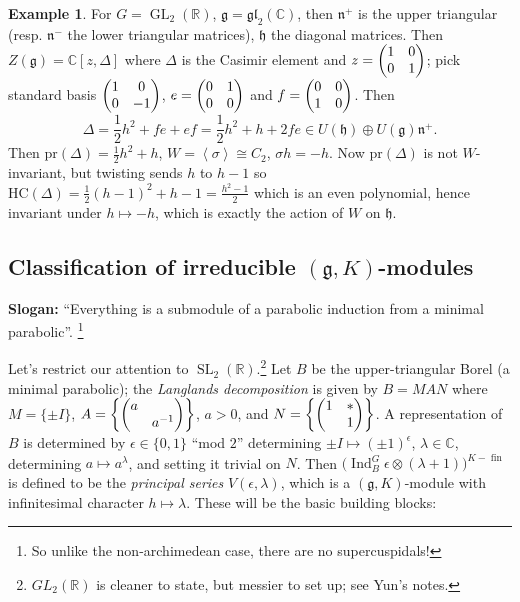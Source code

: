 \documentclass[11pt]{report}
\let\mf\mathfrak
\newcommand{\1}{\mathbbm 1}
\newcommand{\R}{\mathbb{R}}
\newcommand{\g}{\mf g}
\newcommand{\C}{\mathbb{C}}
\DeclareMathOperator{\fin}{fin}
\DeclareMathOperator{\Ind}{Ind}
\DeclareMathOperator{\SL}{SL}
\DeclareMathOperator{\GL}{GL}
\theoremstyle{plain}
\newcounter{ex}
\theoremstyle{definition}
\newtheorem{example}[thm]{Example}
\theoremstyle{remark}
\numberwithin{equation}{section}
\begin{document}
\begin{example}
  For $G = \GL_{2}(\R)$, $\g = \mf{gl}_{2}(\C)$, then $\mf n^{+}$ is
  the upper triangular (resp. $\mf n^{-}$ the lower triangular
  matrices), $\mf h$ the diagonal matrices. Then $Z(\g) = \C[z,\Delta]$
  where $\Delta$ is the Casimir element and $z = \mqty(1  & 0 \\ 0 & 1)$;
  pick standard basis $\mqty(1  & 0 \\ 0 & -1)$, $e = \mqty(0  & 1 \\
  0 & 0)$ and $f = \mqty(0  & 0 \\ 1 & 0)$. Then
  \begin{equation}
    \label{eq:13}
    \Delta = \frac{1}{2}h^{2}   + fe + ef = \frac{1}{2}h^{2} + h + 2fe \in
    U(\mf h) \oplus U(\g)\mf n^{+}.
  \end{equation}
  Then $\mathrm{pr}(\Delta) = \frac{1}{2}h^{2}+h$, $W = \left\langle \sigma \right\rangle \cong
  C_{2}$, $\sigma h = -h$. Now $\mathrm{pr}(\Delta)$ is not $W$-invariant, but
  twisting sends $h$ to $h-1$ so $\mathrm{HC}(\Delta) =
  \frac{1}{2}(h-1)^{2} + h-1 = \frac{h^{2}-1}{2}$ which is an even
  polynomial, hence invariant under $h \mapsto -h$, which is exactly the
  action of $W$ on $\mf h$. 
\end{example}

\subsection{Classification of irreducible $(\g,K)$-modules}
\textbf{Slogan:} ``Everything is a submodule of a parabolic induction from a 
minimal parabolic''. \footnote{So unlike the non-archimedean case, there are no
supercuspidals!}

Let's restrict our attention to $\SL_{2}(\R)$.\footnote{$GL_{2}(\R)$
  is cleaner to state, but messier to set up; see Yun's notes.} Let $B$ be the
upper-triangular Borel (a minimal parabolic); the \emph{Langlands
  decomposition} is given by $B = MAN$ where $M = \{\pm I\}$,
$A = \qty{\mqty(a & \\ & a^{-1})}$, $a > 0$, and
$N =\qty{\mqty(1 & *\\ & 1)}$. A representation of $B$ is determined
by $\epsilon \in \{0,1\}$ ``mod $2$'' determining $\pm I \mapsto (\pm 1)^{\epsilon}$, $\lambda \in \C$,
determining $a \mapsto a^{\lambda}$, and setting it trivial on $N$. Then
$\big(\Ind_{B}^{G} \epsilon \otimes (\lambda + 1)\big)^{K-\fin}$ is defined to be the
\textit{principal series} $V(\epsilon,\lambda)$, which is a $(\g,K)$-module with
infinitesimal character $h \mapsto \lambda$. These
will be the basic building blocks:
\end{document}
